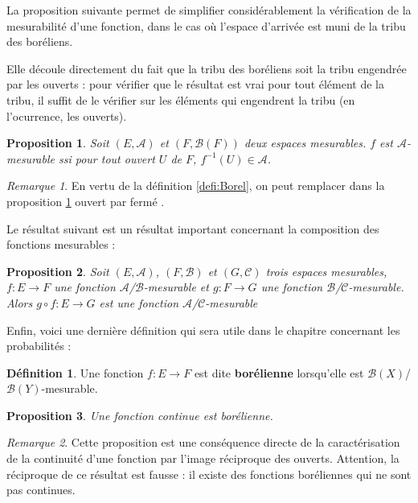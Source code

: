 \documentclass[french]{report}
\theoremstyle{plain}
\newtheorem{prop}{Proposition}[section]
\theoremstyle{definition}
\newtheorem{defi}{Définition}[section]
\theoremstyle{remark}
\newtheorem{rem}{Remarque}[section]
\begin{document}
La proposition suivante permet de simplifier considérablement la vérification de la mesurabilité d'une fonction, dans le cas où l'espace d'arrivée est muni de la tribu des boréliens.

Elle découle directement du fait que la tribu des boréliens soit la tribu engendrée par les ouverts :
pour vérifier que le résultat est vrai pour tout élément de la tribu, il suffit de le vérifier sur les éléments qui engendrent la tribu (en l'ocurrence, les ouverts).

\begin{prop}
  \label{prop:simp}
  Soit $\left(E, \mathcal{A}\right)$ et $\left(F, \mathcal{B}(F)\right)$ deux espaces mesurables.
  $f$ est $\mathcal{A}$-mesurable ssi pour tout ouvert $U$ de $F$, $f^{-1}(U) \in \mathcal{A}$.
\end{prop}

\begin{rem}
  En vertu de la définition \ref{defi:Borel}, on peut remplacer dans la proposition \ref{prop:simp} \og ouvert \fg par \og fermé \fg.
\end{rem}

Le résultat suivant est un résultat important concernant la composition des fonctions mesurables :

\begin{prop}
  Soit $\left(E,\mathcal{A}\right)$, $\left(F,\mathcal{B}\right)$ et $\left(G,\mathcal{C}\right)$ trois espaces mesurables,
  $f : E \longrightarrow F$ une fonction $\mathcal{A}$/$\mathcal{B}$-mesurable et $g : F \longrightarrow G$ une fonction $\mathcal{B}$/$\mathcal{C}$-mesurable.
  Alors $g \circ f : E \longrightarrow G$ est une fonction $\mathcal{A}$/$\mathcal{C}$-mesurable
\end{prop}

Enfin, voici une dernière définition qui sera utile dans le chapitre concernant les probabilités :

\begin{defi}
  Une fonction $f:E\longrightarrow F$ est dite \textbf{borélienne} lorsqu'elle est $\mathcal{B}(X)$/$\mathcal{B}(Y)$-mesurable.
\end{defi}

\begin{prop}
  Une fonction continue est borélienne.
\end{prop}

\begin{rem}
  Cette proposition est une conséquence directe de la caractérisation de la continuité d'une fonction par l'image réciproque des ouverts.
  Attention, la réciproque de ce résultat est fausse : il existe des fonctions boréliennes qui ne sont pas continues.
\end{rem}
\end{document}
